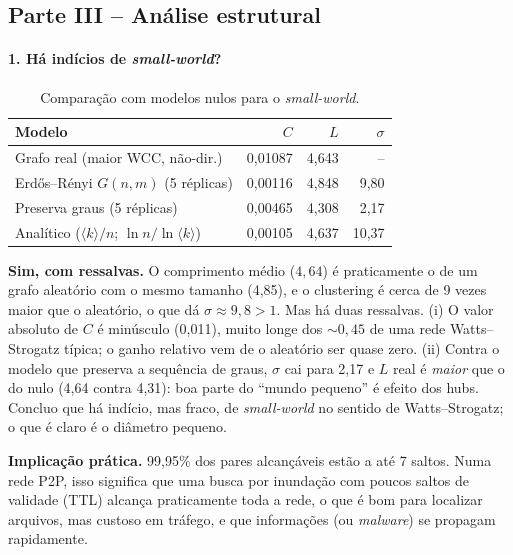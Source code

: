 \documentclass[10pt,a4paper,twocolumn]{article}
\begin{document}
\subsection{Parte III -- Análise estrutural}

\paragraph{1. Há indícios de \emph{small-world}?}
\begin{table}[t]\centering\scriptsize
\caption{Comparação com modelos nulos para o \emph{small-world}.}\label{tab:sw}
\begin{tabular}{lrrr}\toprule
Modelo & $C$ & $L$ & $\sigma$ \\\midrule
Grafo real (maior WCC, não-dir.) & 0,01087 & 4,643 & -- \\
Erdős--Rényi $G(n,m)$ (5 réplicas) & 0,00116 & 4,848 & 9,80 \\
Preserva graus (5 réplicas) & 0,00465 & 4,308 & 2,17 \\
Analítico ($\langle k\rangle/n$; $\ln n/\ln\langle k\rangle$) & 0,00105 & 4,637 & 10,37 \\\bottomrule
\end{tabular}
\end{table}
\noindent\textbf{Sim, com ressalvas.} O comprimento médio ($4{,}64$) é praticamente o de um grafo aleatório com o mesmo tamanho (4,85), e o clustering é cerca de 9 vezes maior que o aleatório, o que dá $\sigma\approx9{,}8>1$. Mas há duas ressalvas. (i) O valor absoluto de $C$ é minúsculo (0,011), muito longe dos ${\sim}0{,}45$ de uma rede Watts--Strogatz típica; o ganho relativo vem de o aleatório ser quase zero. (ii) Contra o modelo que preserva a sequência de graus, $\sigma$ cai para 2,17 e $L$ real é \emph{maior} que o do nulo (4,64 contra 4,31): boa parte do ``mundo pequeno'' é efeito dos hubs. Concluo que há indício, mas fraco, de \emph{small-world} no sentido de Watts--Strogatz; o que é claro é o diâmetro pequeno.

\noindent\textbf{Implicação prática.} 99,95\% dos pares alcançáveis estão a até 7 saltos. Numa rede P2P, isso significa que uma busca por inundação com poucos saltos de validade (TTL) alcança praticamente toda a rede, o que é bom para localizar arquivos, mas custoso em tráfego, e que informações (ou \emph{malware}) se propagam rapidamente.
\end{document}
